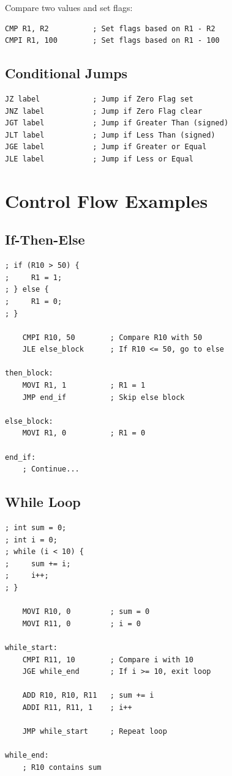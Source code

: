 \documentclass[12pt,a4paper,oneside]{book}
\begin{document}
Compare two values and set flags:

\begin{lstlisting}[style=assembly]
CMP R1, R2          ; Set flags based on R1 - R2
CMPI R1, 100        ; Set flags based on R1 - 100
\end{lstlisting}

\subsection{Conditional Jumps}

\begin{lstlisting}[style=assembly]
JZ label            ; Jump if Zero Flag set
JNZ label           ; Jump if Zero Flag clear
JGT label           ; Jump if Greater Than (signed)
JLT label           ; Jump if Less Than (signed)
JGE label           ; Jump if Greater or Equal
JLE label           ; Jump if Less or Equal
\end{lstlisting}

\section{Control Flow Examples}

\subsection{If-Then-Else}

\begin{lstlisting}[style=assembly, caption={If-Then-Else Structure}]
; if (R10 > 50) {
;     R1 = 1;
; } else {
;     R1 = 0;
; }

    CMPI R10, 50        ; Compare R10 with 50
    JLE else_block      ; If R10 <= 50, go to else
    
then_block:
    MOVI R1, 1          ; R1 = 1
    JMP end_if          ; Skip else block
    
else_block:
    MOVI R1, 0          ; R1 = 0
    
end_if:
    ; Continue...
\end{lstlisting}

\subsection{While Loop}

\begin{lstlisting}[style=assembly, caption={While Loop}]
; int sum = 0;
; int i = 0;
; while (i < 10) {
;     sum += i;
;     i++;
; }

    MOVI R10, 0         ; sum = 0
    MOVI R11, 0         ; i = 0
    
while_start:
    CMPI R11, 10        ; Compare i with 10
    JGE while_end       ; If i >= 10, exit loop
    
    ADD R10, R10, R11   ; sum += i
    ADDI R11, R11, 1    ; i++
    
    JMP while_start     ; Repeat loop
    
while_end:
    ; R10 contains sum
\end{lstlisting}
\end{document}
